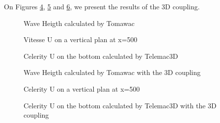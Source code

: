 On Figures \ref{figres3Dcoupl4}, \ref{figres3Dcoupl5} and \ref{figres3Dcoupl6}, we present the results of the 3D coupling. 

\begin{figure} [!h]
\centering
{}
 \caption{Wave Heigth calculated by Tomawac}
\label{figres3Dcoupl}
\end{figure}

\begin{figure} [!h]
\centering
{}
 \caption{Vitesse U on a vertical plan at x=500}
\label{figres3Dcoupl2}
\end{figure}

\begin{figure} [!h]
\centering
{}
 \caption{Celerity U on the bottom calculated by Telemac3D}
\label{figres3Dcoupl3}
\end{figure}

\begin{figure} [!h]
\centering
{}
 \caption{Wave Heigth calculated by Tomawac with the 3D coupling}
\label{figres3Dcoupl4}
\end{figure}

\begin{figure} [!h]
\centering
{}
 \caption{Celerity U on a vertical plan at x=500}
\label{figres3Dcoupl5}
\end{figure}

\begin{figure} [!h]
\centering
{}
 \caption{Celerity U on the bottom calculated by Telemac3D with the 3D coupling}
\label{figres3Dcoupl6}
\end{figure}

